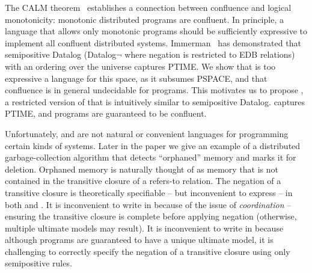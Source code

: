 The CALM theorem~\cite{cidr11, declarative-imperative, relational-transducers} establishes a connection between confluence
and logical monotonicity: monotonic distributed programs are confluent.  In principle, a language that allows only
monotonic programs should be sufficiently expressive to implement all confluent distributed systems.
Immerman~\cite{immerman-ptime} has demonstrated that semipositive Datalog (Datalog$\lnot$ where negation is restricted to EDB relations) with an ordering over the universe captures PTIME.
We show that \lang is too expressive a language for this space, as it subsumes PSPACE, and that confluence is in general
undecidable for \lang programs.  This motivates us to propose \slang, a restricted version of \lang that is intuitively similar to semipositive Datalog.  \slang captures PTIME, and \slang programs are guaranteed to be confluent.

Unfortunately, \lang and \slang are not natural or convenient languages for programming certain kinds of systems.  Later in the paper we give 
an example of a distributed garbage-collection algorithm that detects ``orphaned'' memory and marks it for deletion.  Orphaned memory is naturally thought of as memory that is not contained in the transitive closure of a refers-to relation.  The negation of a transitive closure is theoretically specifiable -- but inconvenient
to express -- in both \lang and \slang.  It is inconvenient to write in \lang because of the issue of {\em coordination} -- ensuring the transitive closure is complete before applying negation (otherwise, multiple ultimate models may result).  It is inconvenient to write in \slang because although \slang programs are guaranteed to have a unique ultimate model, it is challenging to correctly specify the negation of a transitive closure using only semipositive rules.


